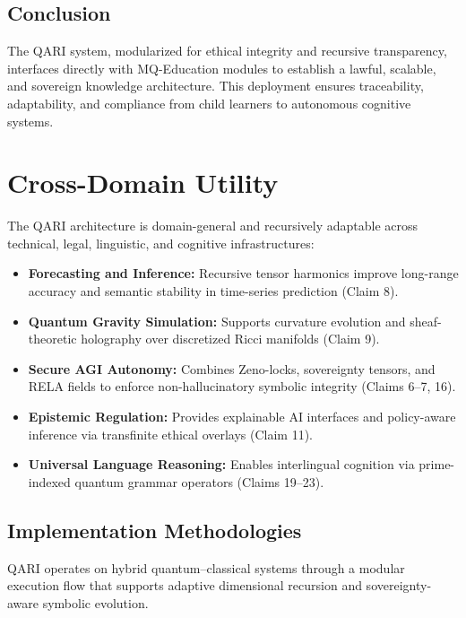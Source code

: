 \documentclass[12pt]{article}
\begin{document}
\subsection{Conclusion}

The QARI system, modularized for ethical integrity and recursive transparency, interfaces directly with MQ-Education modules to establish a lawful, scalable, and sovereign knowledge architecture. This deployment ensures traceability, adaptability, and compliance from child learners to autonomous cognitive systems.

\section{Cross-Domain Utility}

The QARI architecture is domain-general and recursively adaptable across technical, legal, linguistic, and cognitive infrastructures:

\begin{itemize}
    \item \textbf{Forecasting and Inference:} Recursive tensor harmonics improve long-range accuracy and semantic stability in time-series prediction (Claim 8).
    \item \textbf{Quantum Gravity Simulation:} Supports curvature evolution and sheaf-theoretic holography over discretized Ricci manifolds (Claim 9).
    \item \textbf{Secure AGI Autonomy:} Combines Zeno-locks, sovereignty tensors, and RELA fields to enforce non-hallucinatory symbolic integrity (Claims 6–7, 16).
    \item \textbf{Epistemic Regulation:} Provides explainable AI interfaces and policy-aware inference via transfinite ethical overlays (Claim 11).
    \item \textbf{Universal Language Reasoning:} Enables interlingual cognition via prime-indexed quantum grammar operators (Claims 19–23).
\end{itemize}

\subsection{Implementation Methodologies}

QARI operates on hybrid quantum–classical systems through a modular execution flow that supports adaptive dimensional recursion and sovereignty-aware symbolic evolution.
\end{document}
